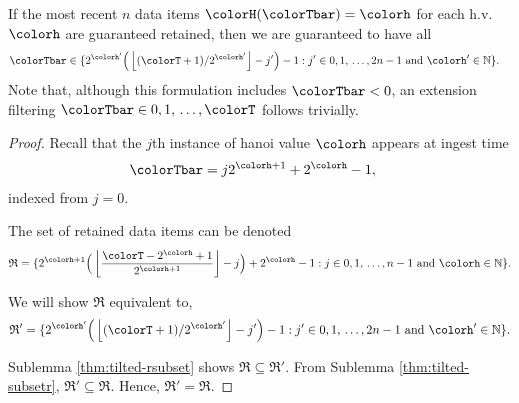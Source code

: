 \begin{lemma}
\label{thm:retained-equivalence-tilted}
If the most recent $n$ data items $\colorH(\colorTbar) = \colorh$ for each h.v. $\colorh$ are guaranteed retained, then we are guaranteed to have all
\begin{align*}
\colorTbar
&\in
\{
  2^{\colorh'}\Big(\left\lfloor (\colorT + 1) / 2^{\colorh'} \right\rfloor - j'\Big) - 1
  :
  j' \in 0,1,\,\ldots,2n-1
  \text{ and }
  \colorh' \in \mathbb{N}
\}.
\end{align*}
Note that, although this formulation includes $\colorTbar < 0$, an extension filtering $\colorTbar \in 0,1,\,\ldots,\colorT$ follows trivially.
\end{lemma}
\begin{proof}

Recall that the $j$th instance of hanoi value $\colorh$ appears at ingest time
\begin{align*}
\colorTbar
&= j2^{\colorh + 1} + 2^{\colorh} - 1,
\end{align*}
indexed from $j=0$.

The set of retained data items can be denoted
\begin{align*}
\mathfrak{R} =
\{
  2^{\colorh + 1}\Big( \left\lfloor\frac{\colorT - 2^{\colorh} + 1}{2^{\colorh + 1}} \right\rfloor - j\Big) + 2^{\colorh} - 1
  :
  j \in 0,1,\,\ldots,n-1
  \text{ and }
  \colorh \in \mathbb{N}
\}.
\end{align*}

We will show $\mathfrak{R}$ equivalent to,
\begin{align*}
\mathfrak{R}' =
\{
  2^{\colorh'}\Big(\left\lfloor (\colorT + 1)/ 2^{\colorh'} \right\rfloor - j'\Big) - 1
  :
  j' \in 0,1,\,\ldots,2n-1
  \text{ and }
  \colorh' \in \mathbb{N}
\}.
\end{align*}

Sublemma \ref{thm:tilted-rsubset} shows $\mathfrak{R} \subseteq \mathfrak{R}'$.
From Sublemma \ref{thm:tilted-subsetr}, $\mathfrak{R}' \subseteq \mathfrak{R}$.
Hence, $\mathfrak{R}' = \mathfrak{R}$.

\end{proof}

